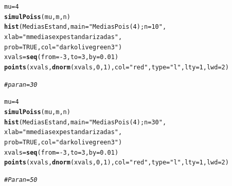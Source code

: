 \documentclass[12pt,letterpaper]{article}\usepackage[]{graphicx}\usepackage[]{color}
\makeatletter
\newcommand{\hlnum}[1]{\textcolor[rgb]{0.686,0.059,0.569}{#1}}%
\newcommand{\hlstr}[1]{\textcolor[rgb]{0.192,0.494,0.8}{#1}}%
\newcommand{\hlcom}[1]{\textcolor[rgb]{0.678,0.584,0.686}{\textit{#1}}}%
\newcommand{\hlopt}[1]{\textcolor[rgb]{0,0,0}{#1}}%
\newcommand{\hlstd}[1]{\textcolor[rgb]{0.345,0.345,0.345}{#1}}%
\newcommand{\hlkwb}[1]{\textcolor[rgb]{0.69,0.353,0.396}{#1}}%
\newcommand{\hlkwc}[1]{\textcolor[rgb]{0.333,0.667,0.333}{#1}}%
\newcommand{\hlkwd}[1]{\textcolor[rgb]{0.737,0.353,0.396}{\textbf{#1}}}%
\newenvironment{kframe}{%
 \def\at@end@of@kframe{}%
 \ifinner\ifhmode%
  \def\at@end@of@kframe{\end{minipage}}%
  \begin{minipage}{\columnwidth}%
 \fi\fi%
 \def\FrameCommand##1{\hskip\@totalleftmargin \hskip-\fboxsep
 \colorbox{shadecolor}{##1}\hskip-\fboxsep
     \hskip-\linewidth \hskip-\@totalleftmargin \hskip\columnwidth}%
 \MakeFramed {\advance\hsize-\width
   \@totalleftmargin\z@ \linewidth\hsize
   \@setminipage}}%
 {\par\unskip\endMakeFramed%
 \at@end@of@kframe}
\newenvironment{knitrout}{}{} %
\makeatother
\begin{document}
\begin{enumerate}
\begin{knitrout}
\begin{kframe}
\begin{alltt}
\hlstd{mu}\hlkwb{=}\hlnum{4}
\hlkwd{simulPoiss}\hlstd{(mu, m, n)}
\hlkwd{hist}\hlstd{(MediasEstand,} \hlkwc{main}\hlstd{=}\hlstr{"Medias Pois(4); n=10"}\hlstd{,}
     \hlkwc{xlab}\hlstd{=}\hlstr{"m medias exp estandarizadas"}\hlstd{,}
\hlkwc{prob}\hlstd{=}\hlnum{TRUE}\hlstd{,} \hlkwc{col}\hlstd{=}\hlstr{"darkolivegreen3"}\hlstd{)}
\hlstd{xvals} \hlkwb{=} \hlkwd{seq}\hlstd{(}\hlkwc{from}\hlstd{=}\hlopt{-}\hlnum{3}\hlstd{,} \hlkwc{to}\hlstd{=}\hlnum{3}\hlstd{,} \hlkwc{by}\hlstd{=}\hlnum{0.01}\hlstd{)}
\hlkwd{points}\hlstd{(xvals,} \hlkwd{dnorm}\hlstd{(xvals,} \hlnum{0}\hlstd{,} \hlnum{1}\hlstd{),} \hlkwc{col} \hlstd{=} \hlstr{"red"}\hlstd{,} \hlkwc{type}\hlstd{=}\hlstr{"l"}\hlstd{,} \hlkwc{lty}\hlstd{=}\hlnum{1}\hlstd{,} \hlkwc{lwd}\hlstd{=}\hlnum{2}\hlstd{)}

\hlcom{# para n=30 }

\hlstd{mu}\hlkwb{=}\hlnum{4}
\hlkwd{simulPoiss}\hlstd{(mu, m, n)}
\hlkwd{hist}\hlstd{(MediasEstand,} \hlkwc{main}\hlstd{=}\hlstr{"Medias Pois(4); n=30"}\hlstd{,}
     \hlkwc{xlab}\hlstd{=}\hlstr{"m medias exp estandarizadas"}\hlstd{,}
\hlkwc{prob}\hlstd{=}\hlnum{TRUE}\hlstd{,} \hlkwc{col}\hlstd{=}\hlstr{"darkolivegreen3"}\hlstd{)}
\hlstd{xvals} \hlkwb{=} \hlkwd{seq}\hlstd{(}\hlkwc{from}\hlstd{=}\hlopt{-}\hlnum{3}\hlstd{,} \hlkwc{to}\hlstd{=}\hlnum{3}\hlstd{,} \hlkwc{by}\hlstd{=}\hlnum{0.01}\hlstd{)}
\hlkwd{points}\hlstd{(xvals,} \hlkwd{dnorm}\hlstd{(xvals,} \hlnum{0}\hlstd{,} \hlnum{1}\hlstd{),} \hlkwc{col} \hlstd{=} \hlstr{"red"}\hlstd{,} \hlkwc{type}\hlstd{=}\hlstr{"l"}\hlstd{,} \hlkwc{lty}\hlstd{=}\hlnum{1}\hlstd{,} \hlkwc{lwd}\hlstd{=}\hlnum{2}\hlstd{)}

\hlcom{# Para n=50}


\end{alltt}
\end{kframe}
\end{knitrout}
\end{enumerate}
\end{document}
